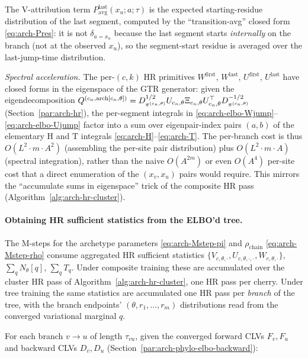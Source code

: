 The V-attribution term $P_{\mathrm{avg}}^{\mathrm{last}}(x_u; a; \tau)$
is the expected starting-residue distribution of the last segment,
computed by the ``transition-avg'' closed form
\eqref{eq:arch-Pres}: it is not $\delta_{a = x_u}$ because the last
segment starts \emph{internally} on the branch (not at the observed
$x_u$), so the segment-start residue is averaged over the
last-jump-time distribution.

\emph{Spectral acceleration.} The per-$(c, k)$ HR primitives
$W^{\mathrm{first}}$, $W^{\mathrm{last}}$, $U^{\mathrm{first}}$,
$U^{\mathrm{last}}$ have closed forms in the eigenspace of the GTR
generator: given the eigendecomposition
$Q^{(c_n, \mathrm{arch}[c_n, \theta])} =
D_{\pi^{(c_n, \theta)}}^{1/2} U_{c_n, \theta} \Xi_{c_n, \theta}
U_{c_n, \theta}^{\top} D_{\pi^{(c_n, \theta)}}^{-1/2}$ (Section~\ref{par:arch-hr}),
the per-segment integrals in \eqref{eq:arch-elbo-Wjump}--\eqref{eq:arch-elbo-Ujump}
factor into a sum over eigenpair-index pairs $(a, b)$ of the elementary
$\mathrm{H}$ and $\mathrm{T}$ integrals \eqref{eq:arch-H}--\eqref{eq:arch-T}.
The per-branch cost is thus $O(L^2 \cdot m \cdot A^2)$ (assembling the
per-site pair distribution) plus $O(L^2 \cdot m \cdot A)$ (spectral
integration), rather than the naive $O(A^{2m})$ or even $O(A^4)$
per-site cost that a direct enumeration of the $(x_v, x_u)$ pairs
would require. This mirrors the ``accumulate sums in eigenspace''
trick of the composite HR pass (Algorithm~\ref{alg:arch-hr-cluster}).

\paragraph{Obtaining HR sufficient statistics from the ELBO'd tree.}
\label{par:arch-phylo-elbo-hr}
The M-steps for the archetype parameters \eqref{eq:arch-Mstep-pi} and
$\rho_{\text{chain}}$ \eqref{eq:arch-Mstep-rho} consume aggregated HR
sufficient statistics
$\{V_{c, \theta, \cdot}, U_{c, \theta, \cdot, \cdot}, W_{c, \theta,
\cdot}\}$, $\sum_q N_\theta[q]$, $\sum_q T_q$. Under composite training
these are accumulated over the cluster HR pass of
Algorithm~\ref{alg:arch-hr-cluster}, one HR pass per cherry. Under
tree training the same statistics are accumulated one HR pass per
\emph{branch} of the tree, with the branch endpoints' $(\theta,
r_1, \ldots, r_{m})$ distributions read from the converged
variational marginal $q$.

For each branch $v \to u$ of length $\tau_{vu}$, given the converged
forward CLVs $F_v, F_u$ and backward CLVs $D_v, D_u$
(Section~\ref{par:arch-phylo-elbo-backward}):

